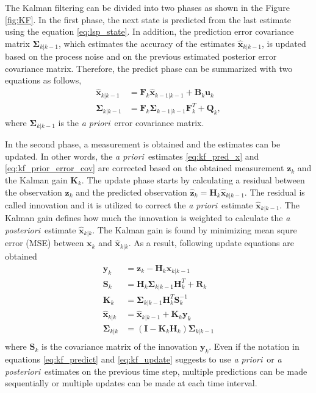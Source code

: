 \documentclass[english, 12pt, a4paper, elec, utf8, a-1b, online]{aaltothesis}
\renewcommand{\vec}[1]{\mathbf{#1}}
\newcommand{\inv}[1]{#1^{-1}}
\newcommand{\xprior}{\hat{\vec{x}}_{k|k-1}}
\newcommand{\xpost}{\hat{\vec{x}}_{k|k}}
\newcommand{\xlast}{\hat{\vec{x}}_{k-1|k-1}}
\newcommand{\priorecov}{\boldsymbol{\Sigma}_{k|k-1}}
\newcommand{\postecov}{\boldsymbol{\Sigma}_{k|k}}
\newcommand{\lastecov}{\boldsymbol{\Sigma}_{k-1|k-1}}
\newcommand{\prefitinnov}{\vec{y}_k}
\newcommand{\x}{\vec{x}_k}
\newcommand{\z}{\vec{z}_k}
\newcommand{\stmodel}{\vec{F}_k}
\newcommand{\cimodel}{\vec{B}_k}
\newcommand{\cinput}{\vec{u}_k}
\newcommand{\omodel}{\vec{H}_k}
\newcommand{\ocov}{\vec{R}_k}
\newcommand{\pcov}{\vec{Q}_k}
\newcommand{\innocov}{\vec{S}_k}
\newcommand{\eye}{\vec{I}}
\newcommand{\gain}{\vec{K}_k}
\def\prior{\textit{a priori}\ }
\def\post{\textit{a posteriori}\ }
\newcommand{\zhat}{\hat{\vec{z}}_k}
\begin{document}
The Kalman filtering can be divided into two phases as shown in the Figure \ref{fig:KF}.
In the first phase, the next state is predicted from the last estimate using the equation \eqref{eq:lsp_state}.
In addition, the prediction error covariance matrix $\priorecov$, which estimates the accuracy of the estimates $\xprior$, is updated based on the process noise and on the previous estimated posterior error covariance matrix.
Therefore, the predict phase can be summarized with two equations as follows,
\begin{subequations}
\label{eq:kf_predict}
\begin{align}
    \xprior &= \stmodel \xlast + \cimodel \cinput \label{eq:kf_pred_x} \\ 
    \priorecov &= \stmodel \lastecov \stmodel^T + \pcov \label{eq:kf_prior_error_cov},
\end{align}
\end{subequations}
where $\priorecov$ is the \prior error covariance matrix.

In the second phase, a measurement is obtained and the estimates can be updated. 
In other words, the \prior estimates \eqref{eq:kf_pred_x} and \eqref{eq:kf_prior_error_cov} are corrected based on the obtained measurement $\z$ and the Kalman gain $\gain$.
The update phase starts by calculating a residual between the observation $\z$ and the predicted observation $\zhat = \omodel \xprior$.
The residual is called innovation and it is utilized to correct the \prior estimate $\xprior$.
The Kalman gain defines how much the innovation is weighted to calculate the \post estimate $\xpost$.
The Kalman gain is found by minimizing mean squre error (MSE) between $\x$ and $\xpost$.
As a result, following update equations are obtained
\begin{subequations}
\label{eq:kf_update}
\begin{align}
    \prefitinnov &= \z - \omodel \xprior \label{eq:kf_prefit_innov}\\ 
    \innocov &= \omodel \priorecov \omodel^T + \ocov \label{eq:kf_innov_cov}\\ 
    \gain &= \priorecov \omodel^T \inv{\innocov} \label{eq:kf_gain}\\ 
    \xpost &= \xprior + \gain \prefitinnov \label{eq:kf_update_x}\\ 
    \postecov &= \left( \eye - \gain \omodel \right) \priorecov  \label{eq:kf_post_error_cov}\\
\end{align}
\end{subequations}
where $\innocov$ is the covariance matrix of the innovation $\prefitinnov$. 
Even if the notation in equations \eqref{eq:kf_predict} and \eqref{eq:kf_update} suggests to use \prior or \post estimates on the previous time step, multiple predictions can be made sequentially or multiple updates can be made at each time interval.
\end{document}
